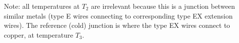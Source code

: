 Note: all temperatures at $T_2$ are irrelevant because this is a junction between similar metals (type E wires connecting to corresponding type EX extension wires).  The reference (cold) junction is where the type EX wires connect to copper, at temperature $T_3$.










